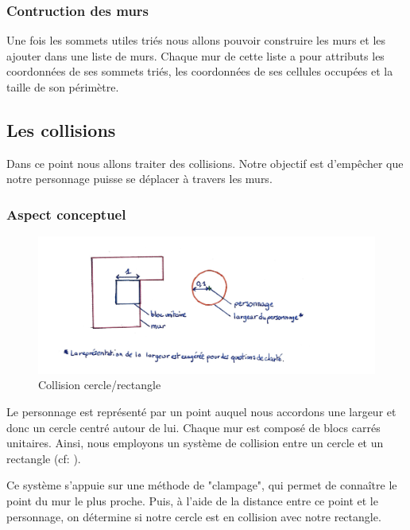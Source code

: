 \documentclass[11pt]{article}
\begin{document}
\subsubsection{Contruction des murs}
Une fois les sommets utiles triés nous allons pouvoir construire les murs et les ajouter dans une liste de murs. Chaque mur de cette liste a pour attributs les coordonnées de ses sommets triés, les coordonnées de ses cellules occupées et la taille de son périmètre.

\subsection{Les collisions}

Dans ce point nous allons traiter des collisions. Notre objectif est d'empêcher
que notre personnage puisse se déplacer à travers les murs.

\subsubsection{Aspect conceptuel}

\begin{figure}
	\centering
	\includegraphics[width=1\textwidth]{image/fig1.jpg}
	\caption{Collision cercle/rectangle}
	\label{fig:collision_cercle_rectangle}
\end{figure}

Le personnage est représenté par un point auquel nous accordons une largeur et donc un cercle centré autour de lui.
Chaque mur est composé de blocs carrés unitaires.
Ainsi, nous employons un système de collision entre un cercle et un rectangle (cf: ). 

Ce système s'appuie sur une méthode de "clampage", qui permet de connaître le point du mur le plus proche.
Puis, à l'aide de la distance entre ce point et le personnage, on détermine si notre cercle est en collision avec notre rectangle.
\end{document}
